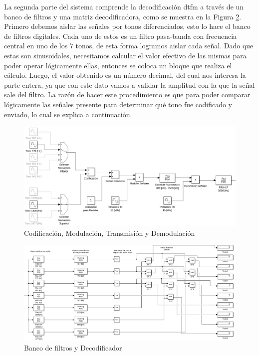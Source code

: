 La segunda parte del sistema comprende la decodificación \gls{dtfm} a través de un banco de filtros y una matriz decodificadora, como se muestra en la Figura \ref{fig:bloques_codec}. Primero debemos aislar las señales por tonos diferenciados, esto lo hace el banco de filtros digitales. Cada uno de estos es un filtro pasa-banda con frecuencia central en uno de los 7 tonos, de esta forma logramos aislar cada señal. Dado que estas son sinusoidales, necesitamos calcular el valor efectivo de las mismas para poder operar lógicamente ellas, entonces se coloca un bloque que realiza el cálculo. Luego, el valor obtenido es un número decimal, del cual nos interesa la parte entera, ya que con este dato vamos a validar la amplitud con la que la señal sale del filtro. La razón de hacer este procedimiento es que para poder comparar lógicamente las señales presente para determinar qué tono fue codificado y enviado, lo cual se explica a continuación.

\begin{figure}[H]
  \centering
  \includegraphics[width=\linewidth]{images/modem.png}
  \caption{Codificación, Modulación, Transmisión y Demodulación}
  \label{fig:bloques_modem}
\end{figure}

\begin{figure}[H]
  \centering
  \includegraphics[width=\linewidth]{images/codec.png}
  \caption{Banco de filtros y Decodificador}
  \label{fig:bloques_codec}
\end{figure}

